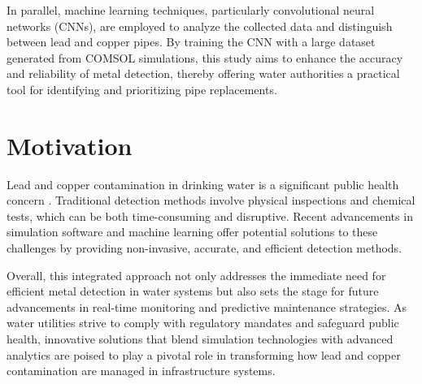 In parallel, machine learning techniques, particularly convolutional neural networks (CNNs), are employed to analyze the collected data and distinguish between lead and copper pipes. By training the CNN with a large dataset generated from COMSOL simulations, this study aims to enhance the accuracy and reliability of metal detection, thereby offering water authorities a practical tool for identifying and prioritizing pipe replacements.



\section{Motivation}
\label{sec:testfig}

Lead and copper contamination in drinking water is a significant public health concern \cite{epa_lead_2023}. Traditional detection methods involve physical inspections and chemical tests, which can be both time-consuming and disruptive. Recent advancements in simulation software and machine learning offer potential solutions to these challenges by providing non-invasive, accurate, and efficient detection methods.

Overall, this integrated approach not only addresses the immediate need for efficient metal detection in water systems but also sets the stage for future advancements in real-time monitoring and predictive maintenance strategies. As water utilities strive to comply with regulatory mandates and safeguard public health, innovative solutions that blend simulation technologies with advanced analytics are poised to play a pivotal role in transforming how lead and copper contamination are managed in infrastructure systems.


% 				
% 



